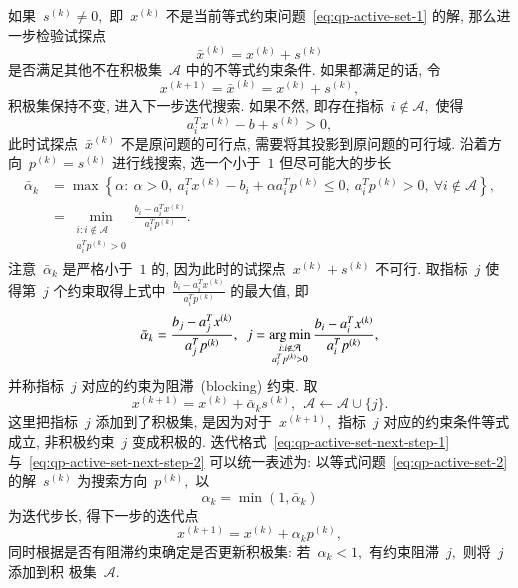 如果~${s}^{(k)} \neq {0},$ 即~${x}^{(k)}$ 不是当前等式约束问题~\eqref{eq:qp-active-set-1} 的解, 那么进一步检验试探点
\begin{equation}
\label{eq:qp-active-set-test-point}
\bar{{x}}^{(k)} = {x}^{(k)} + {s}^{(k)}
\end{equation}
是否满足其他不在积极集~$\mathcal{A}$ 中的不等式约束条件. 如果都满足的话, 令
\begin{equation}
\label{eq:qp-active-set-next-step-1}
{x}^{(k+1)} = \bar{{x}}^{(k)} = {x}^{(k)} + {s}^{(k)},
\end{equation}
积极集保持不变, 进入下一步迭代搜索. 如果不然, 即存在指标~$i \not\in \mathcal{A},$ 使得
\begin{equation*}
{a}_i^T {x}^{(k)} - {b} + {s}^{(k)} > 0,
\end{equation*}
此时试探点~$\bar{{x}}^{(k)}$ 不是原问题的可行点, 需要将其投影到原问题的可行域. 
沿着方向~${p}^{(k)} = {s}^{(k)}$ 进行线搜索, 选一个小于~$1$ 但尽可能大的步长
\begin{equation}
\label{eq:qp-active-set-step-len-1}
\begin{aligned}
\bar{\alpha}_k & = \max \left\{ \alpha : ~ \alpha > 0, ~ {a}_i^T {x}^{(k)} - b_i + \alpha {a}_i^T {p}^{(k)} \leqslant 0, ~ {a}_i^T {p}^{(k)} > 0, ~ \forall i \not\in \mathcal{A} \right\}, \\
& = \min_{\substack{i: i \not\in \mathcal{A} \\ {a}_i^T {p}^{(k)} > 0}} \frac{b_i - {a}_i^T {x}^{(k)}}{{a}_i^T {p}^{(k)}}.
\end{aligned}
\end{equation}
注意~$\bar{\alpha}_k$ 是严格小于~$1$ 的, 因为此时的试探点~${x}^{(k)} + {s}^{(k)}$ 不可行. 取指标~$j$ 使得第~$j$ 个约束取得上式中~$\frac{b_i - {a}_i^T {x}^{(k)}}{{a}_i^T {p}^{(k)}}$ 的最大值, 即
\begin{equation}
\label{eq:qp-active-set-step-len-2}
\bar{\alpha}_k = \frac{b_j - {a}_j^T {x}^{(k)}}{{a}_j^T {p}^{(k)}}, ~~ j = \operatorname*{arg\,min}_{\substack{i: i \not\in \mathcal{A} \\ {a}_i^T {p}^{(k)} > 0}} \frac{b_i - {a}_i^T {x}^{(k)}}{{a}_i^T {p}^{(k)}},
\end{equation}
并称指标~$j$ 对应的约束为阻滞~(blocking) 约束. 取
\begin{equation}
\label{eq:qp-active-set-next-step-2}
{x}^{(k+1)} = {x}^{(k)} + \bar{\alpha}_k {s}^{(k)}, ~~ \mathcal{A} \gets \mathcal{A} \cup \{ j \}.
\end{equation}
这里把指标~$j$ 添加到了积极集, 是因为对于~${x}^{(k+1)},$ 指标~$j$ 对应的约束条件等式成立, 非积极约束~$j$ 变成积极的. 迭代格式~\eqref{eq:qp-active-set-next-step-1}
与~\eqref{eq:qp-active-set-next-step-2} 可以统一表述为: 以等式问题~\eqref{eq:qp-active-set-2} 
的解~${s}^{(k)}$ 为搜索方向~${p}^{(k)},$ 以
\begin{equation}
\label{eq:qp-active-set-step-len-uniform}
\alpha_k = \min (1, \bar{\alpha}_k)
\end{equation}
为迭代步长, 得下一步的迭代点
\begin{equation}
\label{eq:qp-active-set-next-step-uniform}
{x}^{(k+1)} = {x}^{(k)} + \alpha_k {p}^{(k)},
\end{equation}
同时根据是否有阻滞约束确定是否更新积极集: 若~$\alpha_k < 1,$ 有约束阻滞~$j,$ 则将~$j$ 添加到积
极集~$\mathcal{A}.$

